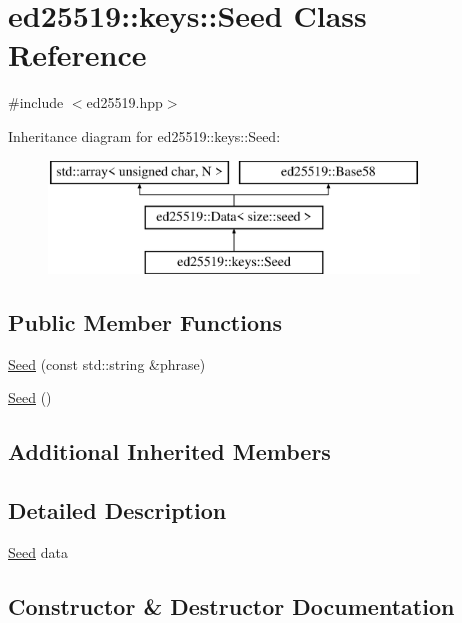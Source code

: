 \hypertarget{classed25519_1_1keys_1_1_seed}{}\section{ed25519\+:\+:keys\+:\+:Seed Class Reference}
\label{classed25519_1_1keys_1_1_seed}


{\ttfamily \#include $<$ed25519.\+hpp$>$}

Inheritance diagram for ed25519\+:\+:keys\+:\+:Seed\+:\begin{figure}[H]
\begin{center}
\leavevmode
\includegraphics[height=3.000000cm]{classed25519_1_1keys_1_1_seed}
\end{center}
\end{figure}
\subsection*{Public Member Functions}
\begin{DoxyCompactItemize}
\item 
\mbox{\hyperlink{classed25519_1_1keys_1_1_seed_a81334bea98cdeb761ed600e8cec3dc8f}{Seed}} (const std\+::string \&phrase)
\item 
\mbox{\hyperlink{classed25519_1_1keys_1_1_seed_a63f29cc0551495dc2084b6f862ed75b5}{Seed}} ()
\end{DoxyCompactItemize}
\subsection*{Additional Inherited Members}


\subsection{Detailed Description}
\mbox{\hyperlink{classed25519_1_1keys_1_1_seed}{Seed}} data 

\subsection{Constructor \& Destructor Documentation}
\mbox{\label{classed25519_1_1keys_1_1_seed_a81334bea98cdeb761ed600e8cec3dc8f}} 
